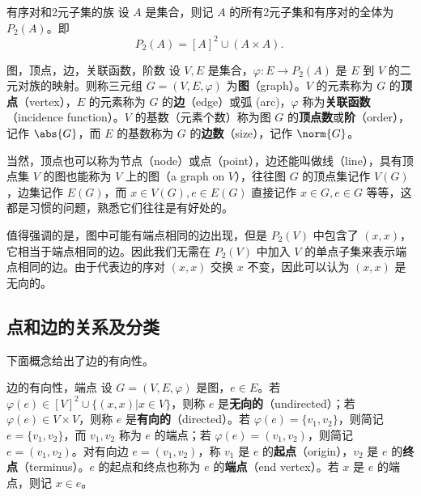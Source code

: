 \begin{definition}{有序对和2元子集的族}
设 $A$ 是集合，则记 $A$ 的所有2元子集和有序对的全体为 $P_2(A)$。即
\begin{equation}
P_2(A)=[A]^2\cup (A\times A).~
\end{equation}

\end{definition}


\begin{definition}{图，顶点，边，关联函数，阶数}
设 $V,E$ 是集合，$\varphi:E\rightarrow P_2(A)$ 是 $E$ 到 $V$ 的二元对族的映射。则称三元组 $G=(V,E,\varphi)$ 为\textbf{图}（graph）。$V$ 的元素称为 $G$ 的\textbf{顶点}（vertex），$E$ 的元素称为 $G$ 的\textbf{边}（edge）或弧 (arc)，$\varphi$ 称为\textbf{关联函数}（incidence function）。$V$ 的基数（元素个数）称为图 $G$ 的\textbf{顶点数}或\textbf{阶}（order），记作 $\abs{G}$，而 $E$ 的基数称为 $G$ 的\textbf{边数}（size），记作 $\norm{G}$。
\end{definition}


当然，顶点也可以称为节点（node）或点（point），边还能叫做线（line），具有顶点集 $V$ 的图也能称为 $V$ 上的图（a graph on $V$），往往图 $G$ 的顶点集记作 $V(G)$，边集记作 $E(G)$，而 $x\in V(G),e\in E(G)$ 直接记作 $x\in G,e\in G$ 等等，这都是习惯的问题，熟悉它们往往是有好处的。

值得强调的是，图中可能有端点相同的边出现，但是 $P_2(V)$ 中包含了 $(x,x)$，它相当于端点相同的边。因此我们无需在 $P_2(V)$ 中加入 $V$ 的单点子集来表示端点相同的边。由于代表边的序对 $(x,x)$ 交换 $x$ 不变，因此可以认为 $(x,x)$ 是无向的。

\subsection{点和边的关系及分类}


下面概念给出了边的有向性。
\begin{definition}{边的有向性，端点}
设 $G=(V,E,\varphi)$ 是图，$e\in E$。若 $\varphi(e)\in[V]^2\cup\{(x,x)|x\in V\}$，则称 $e$ 是\textbf{无向的}（undirected）；若 $\varphi(e)\in V\times V$，则称 $e$ 是\textbf{有向的}（directed）。若 $\varphi(e)=\{v_1,v_2\}$，则简记 $e=\{v_1,v_2\}$，而 $v_1,v_2$ 称为 $e$ 的端点；若 $\varphi(e)=(v_1,v_2)$，则简记 $e=(v_1,v_2)$。对有向边 $e=(v_1,v_2)$，称 $v_1$ 是 $e$ 的\textbf{起点}（origin），$v_2$ 是 $e$ 的\textbf{终点}（terminus）。$e$ 的起点和终点也称为 $e$ 的\textbf{端点}（end vertex）。若 $x$ 是 $e$ 的端点，则记 $x\in e$。
\end{definition}


